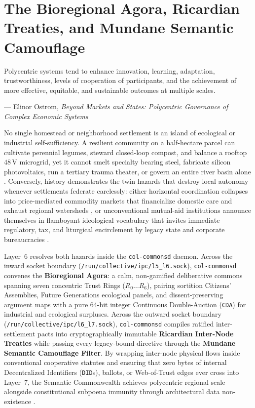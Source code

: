 \chapter{The Bioregional Agora, Ricardian Treaties, and Mundane Semantic Camouflage}
\label{ch:agora-treaties}

\epigraph{Polycentric systems tend to enhance innovation, learning, adaptation, trustworthiness, levels of cooperation of participants, and the achievement of more effective, equitable, and sustainable outcomes at multiple scales.}{--- Elinor Ostrom, \emph{Beyond Markets and States: Polycentric Governance of Complex Economic Systems} \parencite{ostrom2010}}

No single homestead or neighborhood settlement is an island of ecological or industrial self-sufficiency. A resilient community on a half-hectare parcel can cultivate perennial legumes, steward closed-loop compost, and balance a rooftop $48\,\mathrm{V}$ microgrid, yet it cannot smelt specialty bearing steel, fabricate silicon photovoltaics, run a tertiary trauma theater, or govern an entire river basin alone \parencite{ostrom1990,georgescu1971}. Conversely, history demonstrates the twin hazards that destroy local autonomy whenever settlements federate carelessly: either horizontal coordination collapses into price-mediated commodity markets that financialize domestic care and exhaust regional watersheds \parencite{raworth2017,han2015}, or unconventional mutual-aid institutions announce themselves in flamboyant ideological vocabulary that invites immediate regulatory, tax, and liturgical encirclement by legacy state and corporate bureaucracies \parencite{scott1998}.

Layer~6 resolves both hazards inside the \texttt{col-commonsd} daemon. Across the inward socket boundary (\texttt{/run/collective/ipc/l5\_l6.sock}), \texttt{col-commonsd} convenes the \textbf{Bioregional Agora}: a calm, non-gamified deliberative commons spanning seven concentric Trust Rings ($R_0 \dots R_6$), pairing sortition Citizens' Assemblies, Future Generations ecological panels, and dissent-preserving argument maps with a pure 64-bit integer Continuous Double-Auction (\texttt{CDA}) for industrial and ecological surpluses. Across the outward socket boundary (\texttt{/run/collective/ipc/l6\_l7.sock}), \texttt{col-commonsd} compiles ratified inter-settlement pacts into cryptographically immutable \textbf{Ricardian Inter-Node Treaties} \parencite{grigg2004} while passing every legacy-bound directive through the \textbf{Mundane Semantic Camouflage Filter}. By wrapping inter-node physical flows inside conventional cooperative statutes and ensuring that zero bytes of internal Decentralized Identifiers (\texttt{DID}s), ballots, or Web-of-Trust edges ever cross into Layer~7, the Semantic Commonwealth achieves polycentric regional scale alongside constitutional subpoena immunity through architectural data non-existence \parencite{naacp1958}.

